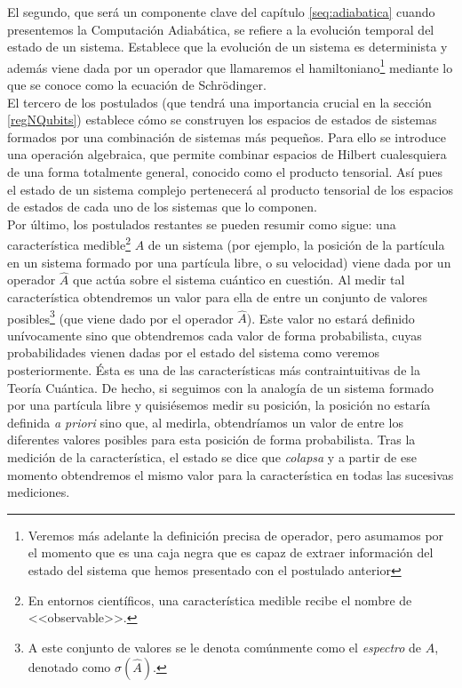 \documentclass[11pt, spanish]{report}
\numberwithin{equation}{section}
\numberwithin{defin}{section}
\begin{document}
El segundo, que será un componente clave del capítulo \ref{seq:adiabatica} cuando presentemos la Computación Adiabática, se refiere a la evolución temporal del estado de un sistema. Establece que la evolución de un sistema es determinista y además viene dada por un operador que llamaremos el hamiltoniano\footnote{Veremos más adelante la definición precisa de operador, pero asumamos por el momento que es una caja negra que es capaz de extraer información del estado del sistema que hemos presentado con el postulado anterior} mediante lo que se conoce como la ecuación de Schrödinger. \\

El tercero de los postulados (que tendrá una importancia crucial en la sección \ref{regNQubits}) establece cómo se construyen los espacios de estados de sistemas formados por una combinación de sistemas más pequeños. Para ello se introduce una operación algebraica, que permite combinar espacios de Hilbert cualesquiera de una forma totalmente general, conocido como el producto tensorial. Así pues el estado de un sistema complejo pertenecerá al producto tensorial de los espacios de estados de cada uno de los sistemas que lo componen. \\

Por último, los postulados restantes se pueden resumir como sigue: una característica medible\footnote{En entornos científicos, una característica medible recibe el nombre de <<observable>>.} $A$ de un sistema (por ejemplo, la posición de la partícula en un sistema formado por una partícula libre, o su velocidad) viene dada por un operador $\hat{A}$ que actúa sobre el sistema cuántico en cuestión. Al medir tal característica obtendremos un valor para ella de entre un conjunto de valores posibles\footnote{A este conjunto de valores se le denota comúnmente como el \emph{espectro} de $\hat{A}$, denotado como $\sigma(\hat{A})$.} (que viene dado por el operador $\hat{A}$). Este valor no estará definido unívocamente sino que obtendremos cada valor de forma probabilista, cuyas probabilidades vienen dadas por el estado del sistema como veremos posteriormente. Ésta es una de las características más contraintuitivas de la Teoría Cuántica. De hecho, si seguimos con la analogía de un sistema formado por una partícula libre y quisiésemos medir su posición, la posición no estaría definida \textit{a priori} sino que, al medirla, obtendríamos un valor de entre los diferentes valores posibles para esta posición de forma probabilista. Tras la medición de la característica, el estado se dice que \emph{colapsa} y a partir de ese momento obtendremos el mismo valor para la característica en todas las sucesivas mediciones.\\
\end{document}
